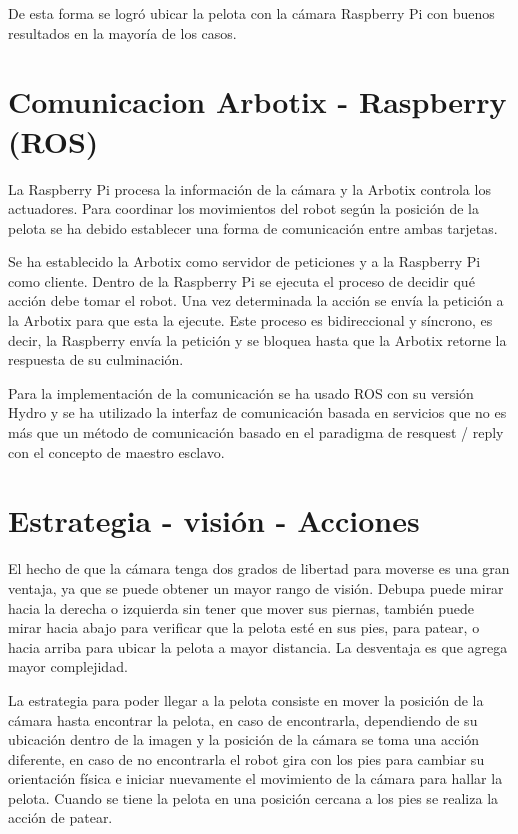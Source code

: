 De esta forma se logró ubicar la pelota con la cámara Raspberry Pi con buenos resultados en la mayoría de los casos. 
 
\section{Comunicacion Arbotix - Raspberry (ROS)}

La Raspberry Pi procesa la información de la cámara y la Arbotix controla los actuadores. Para coordinar los movimientos del robot según la posición de la pelota se ha debido establecer una forma de comunicación entre ambas tarjetas. 

Se ha establecido la Arbotix como servidor de peticiones y a la Raspberry Pi como cliente. Dentro de la Raspberry Pi se ejecuta el proceso de decidir qué acción debe tomar el robot. Una vez determinada la acción se envía la petición a la Arbotix para que esta la ejecute. Este proceso es bidireccional y síncrono, es decir, la Raspberry envía la petición y se bloquea hasta que la Arbotix retorne la respuesta de su culminación.  

Para la implementación de la comunicación se ha usado ROS con su versión Hydro y se ha utilizado la interfaz de comunicación basada en servicios que no es más que un método de comunicación basado en el paradigma de resquest / reply con el concepto de maestro esclavo.

\section{Estrategia - visión - Acciones}

El hecho de  que la cámara tenga dos grados de libertad para moverse es una gran ventaja, ya que se puede obtener un mayor rango de visión. Debupa puede mirar hacia la derecha o izquierda sin tener que mover sus piernas, también puede mirar hacia abajo para verificar que la pelota esté en sus pies, para patear, o hacia arriba para ubicar la pelota a mayor distancia. La desventaja es que agrega mayor complejidad.

La estrategia para poder llegar a la pelota consiste en mover la posición de la cámara hasta encontrar la pelota, en caso de encontrarla, dependiendo de su ubicación dentro de la imagen y la posición de la cámara se toma una acción diferente, en caso de no encontrarla el robot gira con los pies para cambiar su orientación física e iniciar nuevamente el movimiento de la cámara para hallar la pelota. Cuando se tiene la pelota en una posición cercana a los pies se realiza la acción de patear. 

